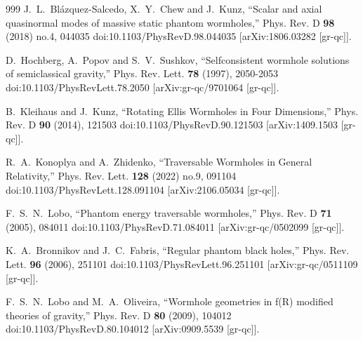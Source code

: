 \documentclass[aps,preprint,groupedaddress,nofootinbib,superscriptaddress,showkeys,showpacs,eqsecnum,amsmath,amssymb]{revtex4-1}
\begin{document}
\begin{thebibliography}{999}
J.~L.~Bl\'azquez-Salcedo, X.~Y.~Chew and J.~Kunz,
``Scalar and axial quasinormal modes of massive static phantom wormholes,''
Phys. Rev. D \textbf{98} (2018) no.4, 044035
doi:10.1103/PhysRevD.98.044035
[arXiv:1806.03282 [gr-qc]].



D.~Hochberg, A.~Popov and S.~V.~Sushkov,
``Selfconsistent wormhole solutions of semiclassical gravity,''
Phys. Rev. Lett. \textbf{78} (1997), 2050-2053
doi:10.1103/PhysRevLett.78.2050
[arXiv:gr-qc/9701064 [gr-qc]].


B.~Kleihaus and J.~Kunz,
``Rotating Ellis Wormholes in Four Dimensions,''
Phys. Rev. D \textbf{90} (2014), 121503
doi:10.1103/PhysRevD.90.121503
[arXiv:1409.1503 [gr-qc]].


R.~A.~Konoplya and A.~Zhidenko,
``Traversable Wormholes in General Relativity,''
Phys. Rev. Lett. \textbf{128} (2022) no.9, 091104
doi:10.1103/PhysRevLett.128.091104
[arXiv:2106.05034 [gr-qc]].


F.~S.~N.~Lobo,
``Phantom energy traversable wormholes,''
Phys. Rev. D \textbf{71} (2005), 084011
doi:10.1103/PhysRevD.71.084011
[arXiv:gr-qc/0502099 [gr-qc]].

K.~A.~Bronnikov and J.~C.~Fabris,
``Regular phantom black holes,''
Phys. Rev. Lett. \textbf{96} (2006), 251101
doi:10.1103/PhysRevLett.96.251101
[arXiv:gr-qc/0511109 [gr-qc]].











F.~S.~N.~Lobo and M.~A.~Oliveira,
``Wormhole geometries in f(R) modified theories of gravity,''
Phys. Rev. D \textbf{80} (2009), 104012
doi:10.1103/PhysRevD.80.104012
[arXiv:0909.5539 [gr-qc]].



\end{thebibliography}
\end{document}
